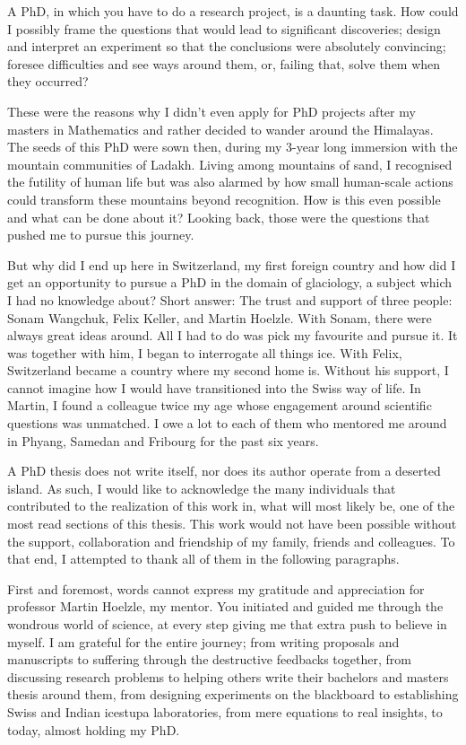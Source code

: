 %
\label{sec:acknowledgement}

A PhD, in which you have to do a research project, is a daunting task. How could I possibly frame the questions
that would lead to significant discoveries; design and interpret an experiment so that the conclusions were
absolutely convincing; foresee difficulties and see ways around them, or, failing that, solve them when they
occurred?

These were the reasons why I didn't even apply for PhD projects after my masters in Mathematics and rather decided
to wander around the Himalayas. The seeds of this PhD were sown then, during my 3-year long immersion with the
mountain communities of Ladakh. Living among mountains of sand, I recognised the futility of human life but was
also alarmed by how small human-scale actions could transform these mountains beyond recognition. How is this
even possible and what can be done about it? Looking back, those were the questions that pushed me to pursue
this journey. 

But why did I end up here in Switzerland, my first foreign country and how did I get an opportunity to pursue a
PhD in the domain of glaciology, a subject which I had no knowledge about? Short answer: The trust and support
of three people: Sonam Wangchuk, Felix Keller, and Martin Hoelzle. With Sonam, there were always great ideas
around. All I had to do was pick my favourite and pursue it. It was together with him, I began to interrogate
all things ice.  With Felix, Switzerland became a country where my second home is. Without his support, I cannot
imagine how I would have transitioned into the Swiss way of life. In Martin, I found a colleague twice my age
whose engagement around scientific questions was unmatched. I owe a lot to each of them who mentored me around
in Phyang, Samedan and Fribourg for the past six years.

A PhD thesis does not write itself, nor does its author operate from a deserted island. As such, I would like to
acknowledge the many individuals that contributed to the realization of this work in, what will most likely be,
one of the most read sections of this thesis. This work would not have been possible without the support,
collaboration and friendship of my family, friends and colleagues. To that end, I attempted to thank all of them
in the following paragraphs.

First and foremost, words cannot express my gratitude and appreciation for professor Martin Hoelzle, my mentor.
You initiated and guided me through the wondrous world of science, at every step giving me that extra push to
believe in myself. I am grateful for the entire journey; from writing proposals and manuscripts to suffering
through the destructive feedbacks together, from discussing research problems to helping others write their
bachelors and masters thesis around them, from designing experiments on the blackboard to establishing Swiss and
Indian icestupa laboratories, from mere equations to real insights, to today, almost holding my PhD.

